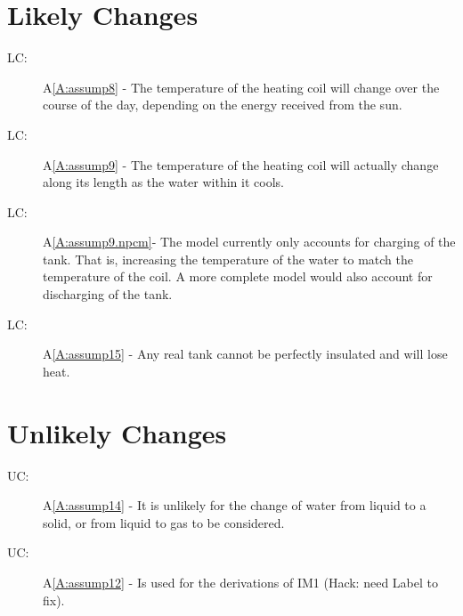 \documentclass[12pt]{article}
\newcounter{lcnum}
\newcommand{\lcthelcnum}{LC\thelcnum}
\newcounter{ucnum}
\newcommand{\uctheucnum}{UC\theucnum}
\begin{document}
\section{Likely Changes}
\label{Sec:LCs}
\begin{description}
\item[\lcthelcnum\label{LC:likeChg2}:]A\ref{A:assump8} - The temperature of the heating coil will change over the course of the day, depending on the energy received from the sun.
\end{description}
\begin{description}
\item[\lcthelcnum\label{LC:likeChg3}:]A\ref{A:assump9} - The temperature of the heating coil will actually change along its length as the water within it cools.
\end{description}
\begin{description}
\item[\lcthelcnum\label{LC:likeChg3}:]A\ref{A:assump9.npcm}- The model currently only accounts for charging of the tank. That is, increasing the temperature of the water to match the temperature of the coil. A more complete model would also account for discharging of the tank.
\end{description}
\begin{description}
\item[\lcthelcnum\label{LC:likeChg6}:]A\ref{A:assump15} - Any real tank cannot be perfectly insulated and will lose heat.
\end{description}
\section{Unlikely Changes}
\label{Sec:UCs}
\begin{description}
\item[\uctheucnum\label{UC:unlikeChg1}:]A\ref{A:assump14} - It is unlikely for the change of water from liquid to a solid, or from liquid to gas to be considered.
\end{description}
\begin{description}
\item[\uctheucnum\label{UC:unlikeChg2}:]A\ref{A:assump12} - Is used for the derivations of IM1 (Hack: need Label to fix).
\end{description}
\end{document}
